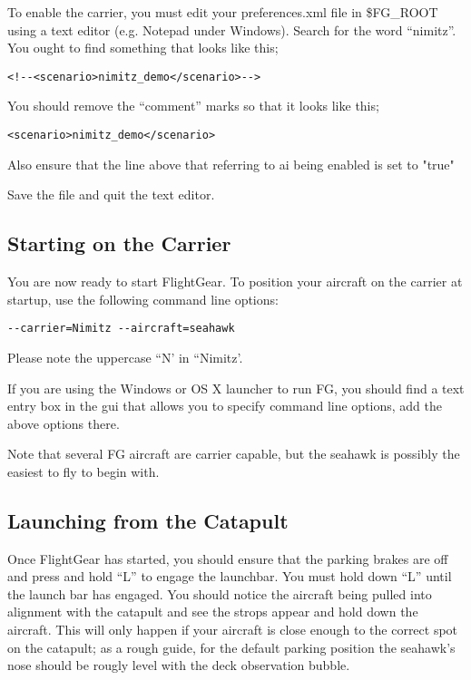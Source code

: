 To enable the carrier, you must edit your preferences.xml file in \$FG\_ROOT using a text editor (e.g. Notepad
under Windows). Search for the word ``nimitz''. You ought to find something that looks like this;

\begin{verbatim}
<!--<scenario>nimitz_demo</scenario>-->
\end{verbatim}

You should remove the ``comment'' marks so that it looks like this;


\begin{verbatim}
<scenario>nimitz_demo</scenario>
\end{verbatim}

Also ensure that the line above that referring to ai being enabled is set to "true"

Save the file and quit the text editor.

\subsection{Starting on the Carrier}

You are now ready to start FlightGear. To position your aircraft on the carrier at startup,
use the following command line options:

\begin{verbatim}
--carrier=Nimitz --aircraft=seahawk
\end{verbatim}

Please note the uppercase ``N' in ``Nimitz'.

If you are using the Windows or OS X launcher to run FG, you should find a text entry box in the gui that
allows you to specify command line options, add the above options there.

Note that several FG aircraft are carrier capable, but the seahawk is possibly the easiest to fly to begin with.

\subsection{Launching from the Catapult}

Once FlightGear has started, you should ensure that the parking brakes are off and press and hold ``L'' to
engage the launchbar. You must hold down ``L'' until the launch bar has engaged.
You should notice the aircraft being pulled into alignment with the catapult and see
the strops appear and hold down the aircraft.  This will only happen if your aircraft is
close enough to the correct spot on the catapult; as a rough guide, for the default
parking position the seahawk's nose should be rougly level with the deck observation bubble.

